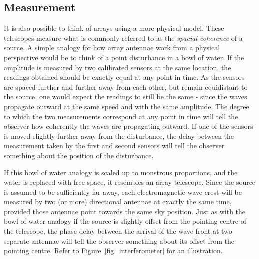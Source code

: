 \subsection{Measurement}
It is also possible to think of arrays using a more physical model. These telescopes measure what is commonly referred 
to as the \textit{spacial coherence} of a source. A simple analogy for how array antennae work from a physical 
perspective would be to think of a point disturbance in a bowl of water. If the amplitude is measured by two calibrated 
sensors at the same location, the readings obtained should be exactly equal at any point in time. As the sensors are 
spaced further and further away from each other, but remain equidistant to the source, one would expect the readings to still
be the same - since the waves propagate outward at the same speed and with the same amplitude. The degree to which
the two measurements correspond at any point in time will tell the observer how coherently the waves are propagating outward.
If one of the sensors is moved slightly further away from the disturbance, the delay between the measurement taken by
the first and second sensors will tell the observer something about the position of the disturbance.

If this bowl of water analogy is scaled up to monstrous proportions, and the water is replaced with free space, it 
resembles an array telescope. Since the source is assumed to be sufficiently far away, each electromagnetic wave crest 
will be measured by two (or more) directional antennae at exactly the same time, provided those antennae point
towards the same sky position. Just as with the bowl of water analogy if the source is slightly offset from the pointing centre of the
telescope, the phase delay between the arrival of the wave front at two separate antennae will tell the observer something about its 
offset from the pointing centre. Refer to Figure~\ref{fig_interferometer} for an illustration.

